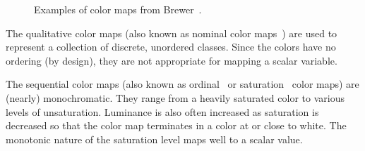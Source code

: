 \documentclass{acmsiggraph}               %
\newcommand{\lcite}[1]{~\cite{#1}}
\newcommand{\scite}[1]{~\shortcite{#1}}
\begin{document}
\begin{figure}
  \centering
  \quad
  \quad
  \caption{Examples of color maps from Brewer\scite{Brewer05}.}
  \label{fig:BrewerExamples}
\end{figure}

The qualitative color maps (also known as nominal color maps\lcite{Ware04})
are used to represent a collection of discrete, unordered classes.  Since
the colors have no ordering (by design), they are not appropriate for
mapping a scalar variable.

The sequential color maps (also known as ordinal\lcite{Ware04} or
saturation\lcite{Rheingans99} color maps) are (nearly) monochromatic.  They
range from a heavily saturated color to various levels of unsaturation.
Luminance is also often increased as saturation is decreased so that the
color map terminates in a color at or close to white.  The monotonic nature
of the saturation level maps well to a scalar value.
\end{document}
